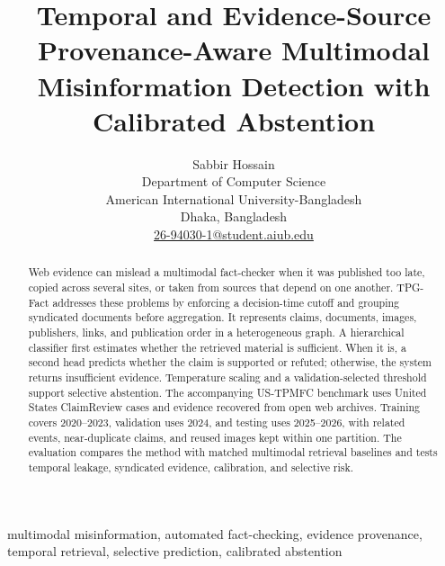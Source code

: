 \documentclass[journal]{IEEEtran}
\title{Temporal and Evidence-Source Provenance-Aware Multimodal Misinformation Detection with Calibrated Abstention}
\author{Sabbir Hossain\\
Department of Computer Science\\
American International University-Bangladesh\\
Dhaka, Bangladesh\\
\href{mailto:26-94030-1@student.aiub.edu}{26-94030-1@student.aiub.edu}}
\newcommand{\systemname}{TPG-Fact}
\newcommand{\datasetname}{US-TPMFC}
\begin{document}
\maketitle

\begin{abstract}
Web evidence can mislead a multimodal fact-checker when it was published too late, copied across several sites, or taken from sources that depend on one another. \systemname{} addresses these problems by enforcing a decision-time cutoff and grouping syndicated documents before aggregation. It represents claims, documents, images, publishers, links, and publication order in a heterogeneous graph. A hierarchical classifier first estimates whether the retrieved material is sufficient. When it is, a second head predicts whether the claim is supported or refuted; otherwise, the system returns insufficient evidence. Temperature scaling and a validation-selected threshold support selective abstention. The accompanying \datasetname{} benchmark uses United States ClaimReview cases and evidence recovered from open web archives. Training covers 2020--2023, validation uses 2024, and testing uses 2025--2026, with related events, near-duplicate claims, and reused images kept within one partition. The evaluation compares the method with matched multimodal retrieval baselines and tests temporal leakage, syndicated evidence, calibration, and selective risk.
\end{abstract}

\begin{IEEEkeywords}
multimodal misinformation, automated fact-checking, evidence provenance, temporal retrieval, selective prediction, calibrated abstention
\end{IEEEkeywords}












\end{document}
